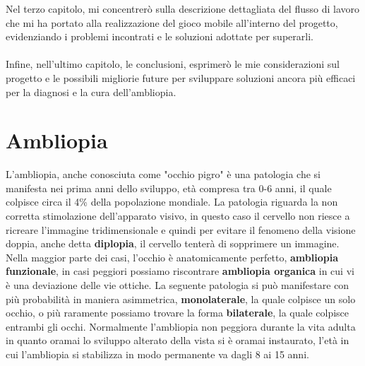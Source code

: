 \documentclass[
a4paper,
cleardoublepage=empty,
headings=twolinechapter,
numbers=autoenddot,
]{scrbook}
\begin{document}
	Nel terzo capitolo, mi concentrerò sulla descrizione dettagliata del flusso di lavoro che mi ha portato alla realizzazione del gioco mobile all'interno del progetto, evidenziando i problemi incontrati e le soluzioni adottate per superarli.\\\\
	
    Infine, nell'ultimo capitolo, le conclusioni, esprimerò le mie considerazioni sul progetto e le possibili migliorie future per sviluppare soluzioni ancora più efficaci per la diagnosi e la cura dell'ambliopia.
	 
	\chapter{Ambliopia}
	L'ambliopia, anche conosciuta come "occhio pigro" è una patologia che si manifesta nei prima anni dello sviluppo, età compresa tra 0-6 anni, il quale colpisce circa il 4\% della popolazione mondiale\cite{perc_amblipia}.
	La patologia riguarda la non corretta stimolazione dell'apparato visivo, in questo caso il cervello non riesce a ricreare l'immagine tridimensionale e quindi per evitare il fenomeno della visione doppia, anche detta \textbf{diplopia}, il cervello tenterà di sopprimere un immagine.
	Nella maggior parte dei casi, l'occhio è anatomicamente perfetto, \textbf{ambliopia funzionale}, in casi peggiori possiamo riscontrare \textbf{ambliopia organica} in cui vi è una deviazione delle vie ottiche.
	La seguente patologia si può manifestare con più probabilità in maniera asimmetrica, \textbf{monolaterale}, la quale colpisce un solo occhio, o più raramente possiamo trovare la forma \textbf{bilaterale}, la quale colpisce entrambi gli occhi.
	Normalmente l'ambliopia non peggiora durante la vita adulta in quanto oramai lo sviluppo alterato della vista si è oramai instaurato, l'età in cui l'ambliopia si stabilizza in modo permanente va dagli 8 ai 15 anni.
\end{document}

